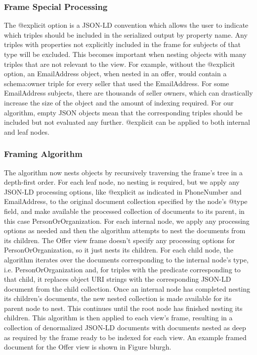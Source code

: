 \subsubsection{Frame Special Processing}
The @explicit option is a JSON-LD convention which allows the user to indicate which triples should be included in the serialized output by property name.
Any triples with properties not explicitly included in the frame for subjects of that type will be excluded.
This becomes important when nesting objects with many triples that are not relevant to the view.  
For example, without the @explicit option, an EmailAddress object, when nested in an offer, would contain a schema:owner triple for every seller that used the EmailAddress.
For some EmailAddress subjects, there are thousands of seller owners, which can drastically increase the size of the object and the amount of indexing required.
For our algorithm, empty JSON objects mean that the corresponding triples should be included but not evaluated any further.
@explicit can be applied to both internal and leaf nodes.

\subsubsection{Framing Algorithm}
The algorithm now nests objects by recursively traversing the frame's tree in a depth-first order.  
For each leaf node, no nesting is required, but we apply any JSON-LD processing options, like @explicit as indicated in PhoneNumber and EmailAddress, to the original document collection specified by the node's @type field, and make available the processed collection of documents to its parent, in this case PersonOrOrganization.  
For each internal node, we apply any processing options as needed and then the algorithm attempts to nest the documents from its children.  
The Offer view frame doesn't specify any processing options for PersonOrOrganization, so it just nests its children.
For each child node, the algorithm iterates over the documents corresponding to the internal node's type, i.e. PersonOrOrganization and, for triples with the predicate corresponding to that child, it replaces object URI strings with the corresponding JSON-LD document from the child collection.  
Once an internal node has completed nesting its children's documents, the new nested collection is made available for its parent node to nest.
This continues until the root node has finished nesting its children.
This algorithm is then applied to each view's frame, resulting in a collection of denormalized JSON-LD documents with documents nested as deep as required by the frame ready to be indexed for each view.
An example framed document for the Offer view is shown in Figure blurgh.

